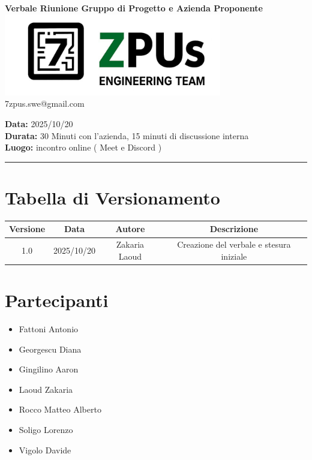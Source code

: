 \documentclass[a4paper,12pt]{article}
\begin{document}
\begin{center}
    \Large \textbf{Verbale Riunione Gruppo di Progetto e Azienda Proponente}\\
    \vspace{0.5cm}
    \includegraphics[width=9.5cm]{../../../images/logo7ZPUs2.jpg}
    \label{7zpus.swe@gmail.com}\\
    \small\hspace{10cm} 7zpus.swe@gmail.com
\end{center}


\noindent
\textbf{Data:} 2025/10/20 \\
\textbf{Durata:} 30 Minuti con l'azienda, 15 minuti di discussione interna \\
\textbf{Luogo:} incontro online ( Meet e Discord )

\vspace{0.3cm}
\hrule
\vspace{0.5cm}

\tableofcontents

\newpage

\section{Tabella di Versionamento}
    \begin{tabular}{|c|c|c|c|}
        \hline
        \textbf{Versione} & \textbf{Data} & \textbf{Autore} & \textbf{Descrizione} \\
        \hline
        1.0 & 2025/10/20 & Zakaria Laoud & Creazione del verbale e stesura iniziale \\

        \hline
    \end{tabular}


\section{Partecipanti}
\begin{itemize}[noitemsep]
    \item Fattoni Antonio 
    \item Georgescu Diana
    \item Gingilino Aaron
    \item Laoud Zakaria
    \item Rocco Matteo Alberto
    \item Soligo Lorenzo
    \item Vigolo Davide
\end{itemize}
\end{document}
